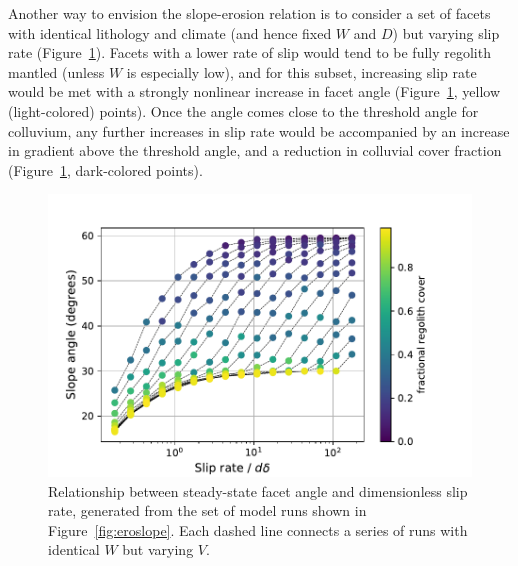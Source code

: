 Another way to envision the slope-erosion relation is to consider a set of facets with identical lithology and climate (and hence fixed $W$ and $D$) but varying slip rate (Figure~\ref{fig:slopeslip}). Facets with a lower rate of slip would tend to be fully regolith mantled (unless $W$ is especially low), and for this subset, increasing slip rate would be met with a strongly nonlinear increase in facet angle (Figure~\ref{fig:slopeslip}, yellow (light-colored) points). Once the angle comes close to the threshold angle for colluvium, any further increases in slip rate would be accompanied by an increase in gradient above the threshold angle, and a reduction in colluvial cover fraction (Figure~\ref{fig:slopeslip}, dark-colored points).

\begin{figure}[ht!]
\centerline{\includegraphics{Figures/slope_angle_vs_slip_rate_by_frac_soil.pdf}}
\caption{Relationship between steady-state facet angle and dimensionless slip rate, generated from the set of model runs shown in Figure~\ref{fig:eroslope}. Each dashed line connects a series of runs with identical $W$ but varying $V$.}
\label{fig:slopeslip}
\end{figure}

